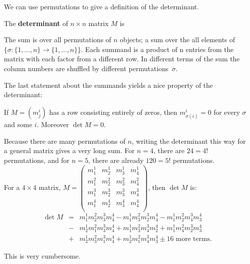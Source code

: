 

We can use permutations to give a definition of the determinant.

\begin{definition}  The {\bf determinant} of $n \times n$ matrix $M$ is 
\begin{center}
\end{center}
\end{definition}
The sum is over all permutations of $n$ objects; a sum over the all elements of $\{ \sigma: \{1,\dots,n\}\to  \{1,\dots,n\}\}$.  Each summand is a product of n entries from the matrix  with each factor from a different row. 
In different terms of the sum the column numbers are shuffled by different permutations~$\sigma$.

The last statement about the summands yields a nice property of the determinant:
\begin{theorem}
If $M=(m^i_j)$ has a row consisting entirely of zeros, then $m^i_{\sigma(i)}=0$ for every $\sigma$ and some $i$.  Moreover
$\det M=0$.
\end{theorem}


\begin{example}
Because there are many permutations of $n$, writing the determinant this way for a general matrix gives a very long sum.  For $n=4$, there are $24=4!$ permutations, and for $n=5$, there are already $120=5!$ permutations.\\

\noindent
For a $4\times 4$ matrix, $M=\begin{pmatrix}
m^1_1 & m^1_2 & m^1_3 & m^1_4\\[1mm]
m^2_1 & m^2_2 & m^2_3 & m^2_4\\[1mm]
m^3_1 & m^3_2 & m^3_3 & m^3_4\\[1mm]
m^4_1 & m^4_2 & m^4_3 & m^4_4\\
\end{pmatrix}$, then $\det M$ is:
\begin{eqnarray*}
\det M &=& 
 m^1_1m^2_2m^3_3m^4_4
-m^1_1m^2_3m^3_2m^4_4
-m^1_1m^2_2m^3_4m^4_3 \\[1mm]
& -&m^1_2m^2_1m^3_3m^4_4
+m^1_1m^2_3m^3_4m^4_2
+m^1_1m^2_4m^3_2m^4_3 \\[1mm]
&+ & m^1_2m^2_3m^3_1m^4_4
+m^1_2m^2_1m^3_4m^4_3
\pm \text{16 more terms}.
\end{eqnarray*}
\end{example}
This is very cumbersome.

